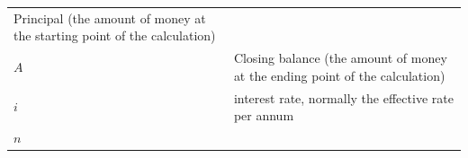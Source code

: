 \begin{itemize}[noitemsep]
{\begin{tabular}[t]{|l|l|}
        Principal (the amount of money at the starting point of the calculation)%
     \tabularnewline\cline{1-1}\cline{2-2}
    
    
        
                  \begin{math}A\end{math}
                 &
    
    
        Closing balance (the amount of money at the ending point of the calculation)%
     \tabularnewline\cline{1-1}\cline{2-2}
    
    
        
                  \begin{math}i\end{math}
                 &
    
    
        interest rate, normally the effective rate per annum%
     \tabularnewline\cline{1-1}\cline{2-2}
    
    
        
                  \begin{math}n\end{math}
                 &
    

\end{tabular}}
\end{itemize}
